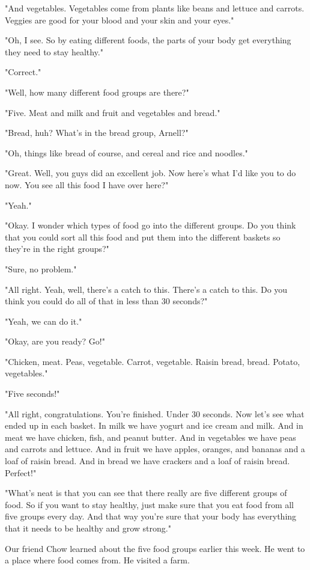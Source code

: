 "And vegetables. Vegetables come from plants like beans and lettuce and carrots. Veggies are good for your blood and your skin and your eyes."

"Oh, I see. So by eating different foods, the parts of your body get everything they need to stay healthy."

"Correct."

"Well, how many different food groups are there?"

"Five. Meat and milk and fruit and vegetables and bread."

"Bread, huh? What's in the bread group, Arnell?"

"Oh, things like bread of course, and cereal and rice and noodles."

"Great. Well, you guys did an excellent job. Now here's what I'd like you to do now. You see all this food I have over here?"

"Yeah."

"Okay. I wonder which types of food go into the different groups. Do you think that you could sort all this food and put them into the different baskets so they're in the right groups?"

"Sure, no problem."

"All right. Yeah, well, there's a catch to this. There's a catch to this. Do you think you could do all of that in less than 30 seconds?"

"Yeah, we can do it."

"Okay, are you ready? Go!"

"Chicken, meat. Peas, vegetable. Carrot, vegetable. Raisin bread, bread. Potato, vegetables."

"Five seconds!"

"All right, congratulations. You're finished. Under 30 seconds. Now let's see what ended up in each basket. In milk we have yogurt and ice cream and milk. And in meat we have chicken, fish, and peanut butter. And in vegetables we have peas and carrots and lettuce. And in fruit we have apples, oranges, and bananas and a loaf of raisin bread. And in bread we have crackers and a loaf of raisin bread. Perfect!"

"What's neat is that you can see that there really are five different groups of food. So if you want to stay healthy, just make sure that you eat food from all five groups every day. And that way you're sure that your body has everything that it needs to be healthy and grow strong."

Our friend Chow learned about the five food groups earlier this week. He went to a place where food comes from. He visited a farm.

